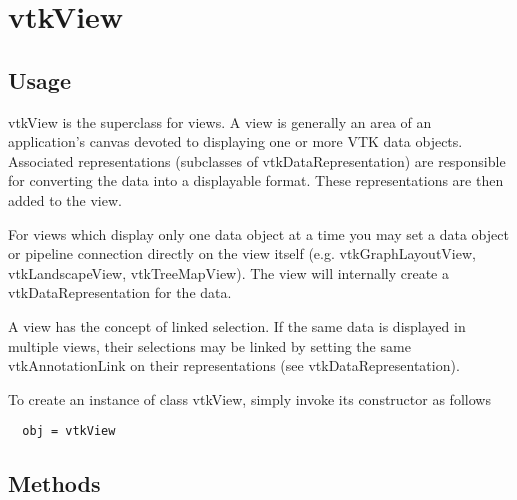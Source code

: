 \section{vtkView}

\subsection{Usage}

 vtkView is the superclass for views.  A view is generally an area of an
 application's canvas devoted to displaying one or more VTK data objects.
 Associated representations (subclasses of vtkDataRepresentation) are
 responsible for converting the data into a displayable format.  These
 representations are then added to the view.

 For views which display only one data object at a time you may set a
 data object or pipeline connection directly on the view itself (e.g.
 vtkGraphLayoutView, vtkLandscapeView, vtkTreeMapView).
 The view will internally create a vtkDataRepresentation for the data.

 A view has the concept of linked selection.  If the same data is displayed
 in multiple views, their selections may be linked by setting the same
 vtkAnnotationLink on their representations (see vtkDataRepresentation).

To create an instance of class vtkView, simply
invoke its constructor as follows
\begin{verbatim}
  obj = vtkView
\end{verbatim}
\subsection{Methods}

